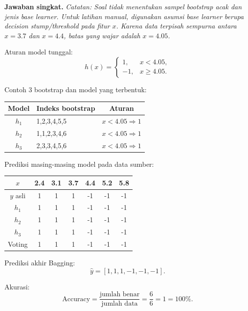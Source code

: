 \documentclass[a4paper,10pt,twocolumn]{article}
\newcommand{\jawab}{\textbf{Jawaban singkat.} }
\newcommand{\catatan}[1]{\textit{Catatan: #1}}
\begin{document}
\jawab
\catatan{Soal tidak menentukan sampel bootstrap acak dan jenis base learner. Untuk latihan manual, digunakan asumsi base learner berupa decision stump/threshold pada fitur $x$. Karena data terpisah sempurna antara $x=3.7$ dan $x=4.4$, batas yang wajar adalah $x=4.05$.}

Aturan model tunggal:
\[
h(x)=
\begin{cases}
1, & x < 4.05,\\
-1, & x \ge 4.05.
\end{cases}
\]

Contoh 3 bootstrap dan model yang terbentuk:
\begin{center}
\scriptsize
\begin{tabular}{c|p{2.3cm}|c}
\toprule
Model & Indeks bootstrap & Aturan \\
\midrule
$h_1$ & 1,2,3,4,5,5 & $x<4.05\Rightarrow 1$ \\
$h_2$ & 1,1,2,3,4,6 & $x<4.05\Rightarrow 1$ \\
$h_3$ & 2,3,3,4,5,6 & $x<4.05\Rightarrow 1$ \\
\bottomrule
\end{tabular}
\end{center}

Prediksi masing-masing model pada data sumber:
\begin{center}
\scriptsize
\begin{tabular}{c|cccccc}
\toprule
$x$ & 2.4 & 3.1 & 3.7 & 4.4 & 5.2 & 5.8 \\
\midrule
$y$ asli & 1 & 1 & 1 & -1 & -1 & -1 \\
$h_1$ & 1 & 1 & 1 & -1 & -1 & -1 \\
$h_2$ & 1 & 1 & 1 & -1 & -1 & -1 \\
$h_3$ & 1 & 1 & 1 & -1 & -1 & -1 \\
Voting & 1 & 1 & 1 & -1 & -1 & -1 \\
\bottomrule
\end{tabular}
\end{center}

Prediksi akhir Bagging:
\[
\boxed{\hat{y}=[1,1,1,-1,-1,-1]}.
\]

Akurasi:
\[
\text{Accuracy}=\frac{\text{jumlah benar}}{\text{jumlah data}}=\frac{6}{6}=1=\boxed{100\%}.
\]
\end{document}

